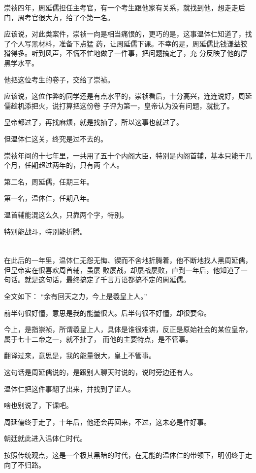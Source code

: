 \documentclass[11pt,a4paper,onecolumn]{article}
\begin{document}
崇祯四年，周延儒担任主考官，有一个考生跟他家有关系，就找到他，想走走后门，周考官很大方，给了个第一名。

应该说，对此类案件，崇祯一向是相当痛恨的，更巧的是，这事温体仁知道了，找了个人写黑材料，准备下点猛
药，让周延儒下课。不幸的是，周延儒比钱谦益狡猾得多。听到风声，不慌不忙地做了一件事，把问题搞定了，充
分反映了他的厚黑学水平。

他把这位考生的卷子，交给了崇祯。

应该说，这位作弊的同学还是有点水平的，崇祯看后，十分高兴，连连说好，周延儒趁机添把火，说打算把这份卷
子评为第一，皇帝认为没有问题，就批了。

皇帝都过了，再找麻烦，就是找抽了，所以这事也就过了。

但温体仁这关，终究是过不去的。

崇祯年间的十七年里，一共用了五十个内阁大臣，特别是内阁首辅，基本只能干几个月，任期超过两年的，只有两
个人。

第二名，周延儒，任期三年。

第一名，温体仁，任期八年。

温首辅能混这么久，只靠两个字，特别。

特别能战斗，特别能折腾。

\section[\thesection]{}

在此后的一年里，温体仁无怨无悔、锲而不舍地折腾着，他不断地找人黑周延儒，但皇帝实在很喜欢周首辅，虽屡
败屡战，却屡战屡败，直到一年后，他知道了一句话。就是这句话，最终搞定了千言万语都搞不定的周延儒。

全文如下： ``余有回天之力，今上是羲皇上人。''

前半句很好懂，意思是我的能量很大。后半句很不好懂，却很要命。

今上，是指崇祯，所谓羲皇上人，具体是谁很难讲，反正是原始社会的某位皇帝，属于七十二帝之一，就不扯了，
而他的主要特点，是不管事。

翻译过来，意思是，我的能量很大，皇上不管事。

这句话是周延儒说的，是跟别人聊天时说的，说时旁边还有人。

温体仁把这件事翻了出来，并找到了证人。

啥也别说了，下课吧。

周延儒终于走了，十年后，他还会再回来，不过，这未必是件好事。

朝廷就此进入温体仁时代。

按照传统观点，这是一个极其黑暗的时代，在无能的温体仁的带领下，明朝终于走向了不归路。
\end{document}
